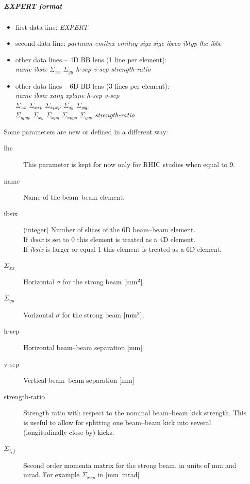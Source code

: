 \documentclass[a4paper,11pt]{report}
\begin{document}
\subparagraph{EXPERT format}

\begin{itemize}
\item first data line: {\em EXPERT}
\item second data line: {\em partnum emitnx emitny sigz sige ibeco
    ibtyp lhc ibbc} 
\item other data lines -- 4D BB lens (1 line per element): \\
{\em name ibsix $\Sigma_{xx}$ $\Sigma_{yy}$ h-sep v-sep strength-ratio}
\item other data lines -- 6D BB lens (3 lines per element): \\
{\em name ibsix xang xplane h-sep v-sep} \\
{\em $\Sigma_{xx}$ $\Sigma_{xxp}$ $\Sigma_{xpxp}$ $\Sigma_{yy}$ $\Sigma_{yyp}$} \\
{\em $\Sigma_{ypyp}$ $\Sigma_{xy}$ $\Sigma_{xpy}$ $\Sigma_{xpyp}$ $\Sigma_{yyp}$ strength-ratio} \\
\end{itemize}

Some parameters are new or defined in a different way:
\begin{description}
\item [lhc] This parameter is kept for now only for RHIC studies when equal to 9.
\item [name] Name of the beam--beam element.
\item [ibsix] (integer) Number of slices of the 6D beam--beam element.\\
  If {\it ibsix} is set to 0 this element is treated as a 4D element.\\
  If {\it ibsix} is larger or equal 1 this element is treated as a 6D element.
\item [$\Sigma_{xx}$] Horizontal $\sigma$ for the strong beam $\rm{[mm^2]}$.
\item [$\Sigma_{yy}$] Vorizontal $\sigma$ for the strong beam $\rm{[mm^2]}$.
\item [h-sep] Horizontal beam--beam separation [mm]
\item [v-sep] Vertical beam--beam separation [mm]
\item [strength-ratio] Strength ratio with respect to the nominal beam--beam kick strength.
  This is useful to allow for splitting one beam--beam kick into several (longitudinally close by) kicks.
\item [$\Sigma_{i,j}$] Second order momenta matrix for the strong beam, in units of mm and mrad.
  For example $\Sigma_{xxp}$ in [mm\ mrad]
\end{description}
\end{document}
